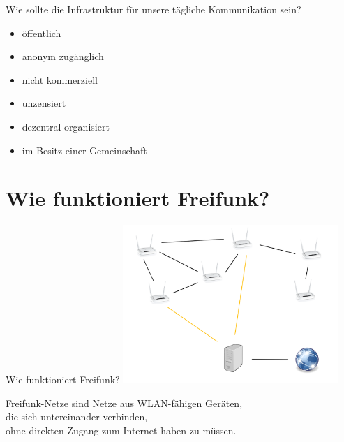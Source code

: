 \documentclass{beamer}
\begin{document}


\begin{frame}{Wie sollte die Infrastruktur für unsere tägliche Kommunikation sein?}
\vfill
\begin{itemize}
\pause\item öffentlich
\pause\item anonym zugänglich
\pause\item nicht kommerziell
\pause\item unzensiert
\pause\item dezentral organisiert
\pause\item im Besitz einer Gemeinschaft
\end{itemize}
\vfill
\end{frame}


\section{Wie funktioniert Freifunk?}
\begin{frame}{Wie funktioniert Freifunk?}
\vfill
\centering
\includegraphics[height=6cm]{images/meshing}

Freifunk-Netze sind Netze aus WLAN-fähigen Geräten,\\ die sich untereinander verbinden,\\ ohne direkten Zugang zum Internet haben zu müssen.
\vfill
\end{frame}
\end{document}
